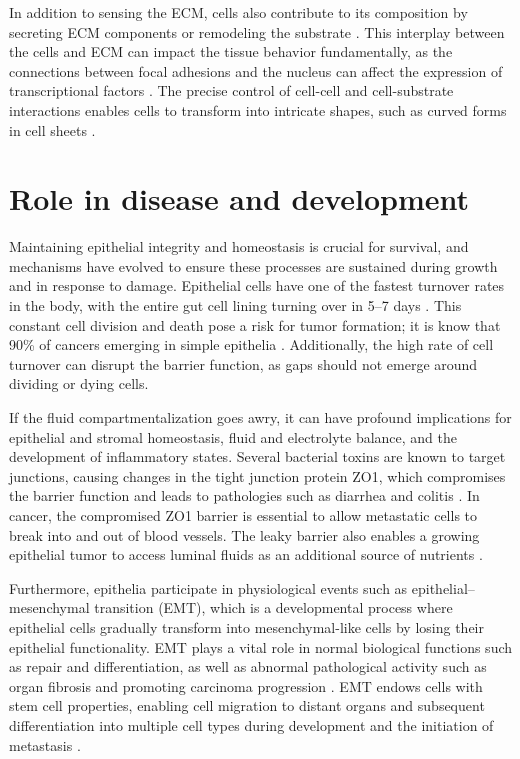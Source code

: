 In addition to sensing the ECM, cells also contribute to its composition by secreting ECM components or remodeling the substrate \cite{malandrino2018}. This interplay between the cells and ECM can impact the tissue behavior fundamentally, as the connections between focal adhesions and the nucleus can affect the expression of transcriptional factors \cite{venturini2020, lomakin2020}. The precise control of cell-cell and cell-substrate interactions enables cells to transform into intricate shapes, such as curved forms in cell sheets \cite{schamberger2022}.

\hypertarget{role-in-disease-and-development}{%
	\section{Role in disease and
		development}\label{role-in-disease-and-development}}

Maintaining epithelial integrity and homeostasis is crucial for survival, and mechanisms have evolved to ensure these processes are sustained during growth and in response to damage. Epithelial cells have one of the fastest turnover rates in the body, with the entire gut cell lining turning over in 5--7 days \cite{barker2014}. This constant cell division and death pose a risk for tumor formation; it is know that 90\% of cancers emerging in simple epithelia \cite{torras2018, eisenhoffer2013}. Additionally, the high rate of cell turnover can disrupt the barrier function, as gaps should not emerge around dividing or dying cells.

If the fluid compartmentalization goes awry, it can have profound implications for epithelial and stromal homeostasis, fluid and electrolyte balance, and the development of inflammatory states. Several bacterial toxins are known to target junctions, causing changes in the tight junction protein ZO1, which compromises the barrier function and leads to pathologies such as diarrhea and colitis \cite{fasano1991}. In cancer, the compromised ZO1 barrier is essential to allow metastatic cells to break into and out of blood vessels. The leaky barrier also enables a growing epithelial tumor to access luminal fluids as an additional source of nutrients \cite{mullin2005}.

Furthermore, epithelia participate in physiological events such as epithelial--mesenchymal transition (EMT), which is a developmental process where epithelial cells gradually transform into mesenchymal-like cells by losing their epithelial functionality. EMT plays a vital role in normal biological functions such as repair and differentiation, as well as abnormal pathological activity such as organ fibrosis and promoting carcinoma progression \cite{alberts2015}. EMT endows cells with stem cell properties, enabling cell migration to distant organs and subsequent differentiation into multiple cell types during development and the initiation of metastasis \cite{thiery2009}. 

